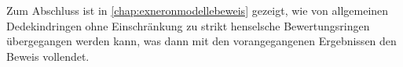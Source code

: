 Zum Abschluss ist in \autoref{chap:exneronmodellebeweis} gezeigt,
wie von allgemeinen Dedekindringen ohne Einschränkung zu strikt
henselsche Bewertungsringen übergegangen werden kann, was dann mit den
vorangegangenen Ergebnissen den Beweis vollendet.


